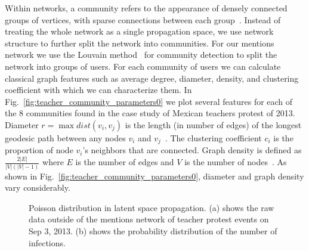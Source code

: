 Within networks, a community refers to the appearance of densely connected groups of vertices, with sparse connections between each group~\cite{newman2006modularity}.
Instead of treating the whole network as a single propagation space,
we use network structure to further split the network into communities.
For our mentions network we use the Louvain method~\cite{blondel2008fast} for community detection to split the network into groups of users. For each community of users we can calculate classical graph features such as average degree, diameter, density, and clustering coefficient with which we can characterize them. In Fig.~\ref{fig:teacher_community_parameters0} we plot several features for each of the 8 communities found in the case study of Mexican teachers protest of 2013. Diameter $r = \max dist(v_i, v_j)$ is the length (in number of edges) of the longest geodesic path between any nodes $v_i$ and $v_j$~\cite{newman2003structure}. The clustering coefficient $c_i$ is the proportion of node $v_i$'s neighbors that are connected. Graph density is defined as $\frac{2|E|}{|V|(|V|-1)}$ where $E$ is the number of edges and $V$ is the
number of nodes~\cite{scott2011sage}. As shown in Fig.~\ref{fig:teacher_community_parameters0}, diameter and graph density vary considerably.


\begin{figure}[t]
\centering
{}
\caption{Poisson distribution in latent space propagation. (a) shows the raw data outside of the mentions network of teacher protest events on Sep 3, 2013. (b) shows the probability distribution of the number of
infections.}
\label{fig:Poisson}
\end{figure}






